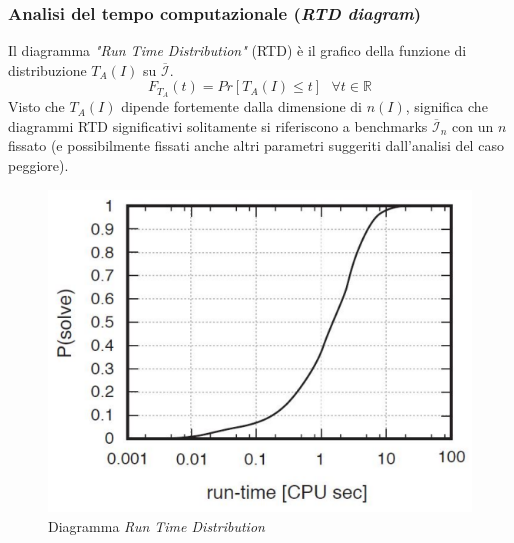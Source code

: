 \documentclass{article}
\begin{document}
\subsubsection{Analisi del tempo computazionale (\textit{RTD diagram})}
Il diagramma \textit{"Run Time Distribution"} (RTD) è il grafico della funzione di
distribuzione $T_A(I)$ su $\overline{\mathcal{I}}$.
$$F_{T_A}(t)=Pr[T_A(I)\leq t]\text{  }\forall t\in\mathbb{R}$$
Visto che $T_A(I)$ dipende fortemente dalla dimensione di $n(I)$, significa che
diagrammi RTD significativi solitamente si riferiscono a benchmarks
$\overline{\mathcal{I}}_n$ con un $n$ fissato (e possibilmente fissati anche
altri parametri suggeriti dall'analisi del caso peggiore).
\begin{figure}[H]
    \centering
    \includegraphics[scale=0.35]{images/RTD_0.png}
    \caption{Diagramma \textit{Run Time Distribution}}
\end{figure}
\end{document}
